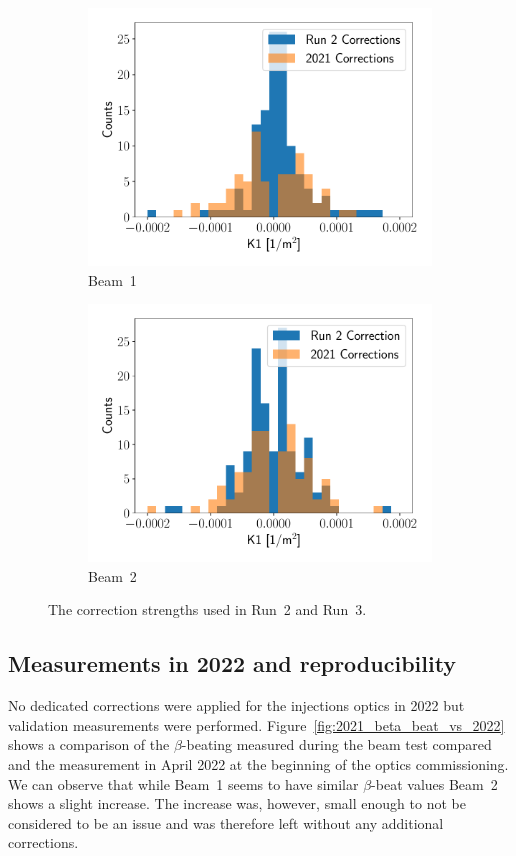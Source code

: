 \documentclass[a4paper]{cernatsnote}
\begin{document}
\begin{figure}[ht]
\begin{subfigure}{.5\textwidth}
  \centering
  \includegraphics[width=.9\linewidth]{beam1_corrections.pdf}  
  \caption{Beam~1}
\end{subfigure}
\begin{subfigure}{.5\textwidth}
  \centering
  \includegraphics[width=.9\linewidth]{beam2_corrections.pdf}  
  \caption{Beam~2}
\end{subfigure}
\caption{The correction strengths used in Run~2 and Run~3.}
\label{fig:corrector_strength_injection}
\end{figure}


\subsection{Measurements in 2022 and reproducibility}\label{sec:repro}
No dedicated corrections were applied for the injections optics in 2022 but validation measurements were performed. Figure~\ref{fig:2021_beta_beat_vs_2022} shows a comparison of the $\beta$-beating measured during the beam test compared and the measurement in April 2022 at the beginning of the optics commissioning. We can observe that while Beam~1 seems to have similar $\beta$-beat values Beam~2 shows a slight increase. The increase was, however, small enough to not be considered to be an issue and was therefore left without any additional corrections. 
\end{document}
